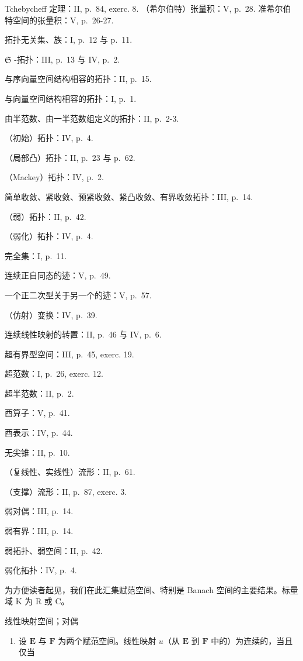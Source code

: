 Tchebycheff 定理：II, p.~84, exerc. 8. （希尔伯特）张量积：V, p.~28. 准希尔伯特空间的张量积：V, p.~26-27.

拓扑无关集、族：I, p.~12 与 p.~11.

\(\mathfrak{S}\) -拓扑：III, p.~13 与 IV, p.~2.

与序向量空间结构相容的拓扑：II, p.~15.

与向量空间结构相容的拓扑：I, p.~1.

由半范数、由一半范数组定义的拓扑：II, p.~2-3.

（初始）拓扑：IV, p.~4.

（局部凸）拓扑：II, p.~23 与 p.~62.

（Mackey）拓扑：IV, p.~2.

简单收敛、紧收敛、预紧收敛、紧凸收敛、有界收敛拓扑：III, p.~14.

（弱）拓扑：II, p.~42.

（弱化）拓扑：IV, p.~4.

完全集：I, p.~11.

连续正自同态的迹：V, p.~49.

一个正二次型关于另一个的迹：V, p.~57.

（仿射）变换：IV, p.~39.

连续线性映射的转置：II, p.~46 与 IV, p.~6.

超有界型空间：III, p.~45, exerc. 19.

超范数：I, p.~26, exerc. 12.

超半范数：II, p.~2.

酉算子：V, p.~41.

酉表示：IV, p.~44.

无尖锥：II, p.~10.

（复线性、实线性）流形：II, p.~61.

（支撑）流形：II, p.~87, exerc. 3.

弱对偶：III, p.~14.

弱有界：III, p.~14.

弱拓扑、弱空间：II, p.~42.

弱化拓扑：IV, p.~4.


为方便读者起见，我们在此汇集赋范空间、特别是 Banach 空间的主要结果。标量域 K 为 R 或 C。

线性映射空间；对偶

\begin{enumerate}
\def\labelenumi{\arabic{enumi})}
\tightlist
\item
  设 \(\mathbf{E}\) 与 \(\mathbf{F}\) 为两个赋范空间。线性映射 \(u\)（从 \(\mathbf{E}\) 到 \(\mathbf{F}\) 中的）为连续的，当且仅当
\end{enumerate}


